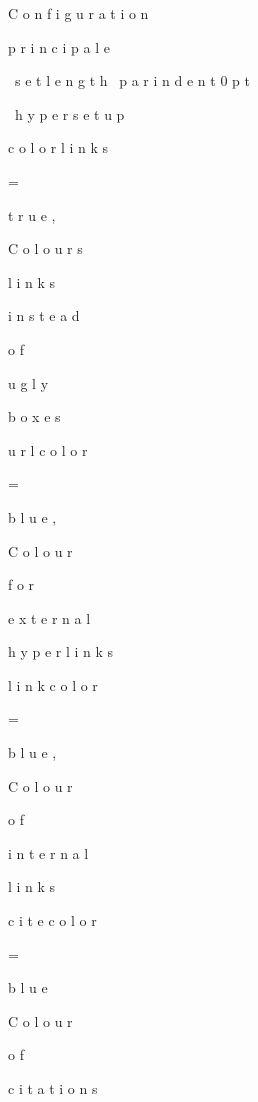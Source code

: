  
 
 
 


%
 
C
o
n
f
i
g
u
r
a
t
i
o
n
 
p
r
i
n
c
i
p
a
l
e

\
s
e
t
l
e
n
g
t
h
{
\
p
a
r
i
n
d
e
n
t
}
{
0
p
t
}


 
 
 
 
\
h
y
p
e
r
s
e
t
u
p
{

 
 
 
 
c
o
l
o
r
l
i
n
k
s
 
 
 
=
 
t
r
u
e
,
 
 
 
 
%
 
C
o
l
o
u
r
s
 
l
i
n
k
s
 
i
n
s
t
e
a
d
 
o
f
 
u
g
l
y
 
b
o
x
e
s

 
 
 
 
u
r
l
c
o
l
o
r
 
 
 
 
 
=
 
b
l
u
e
,
 
 
 
 
%
 
C
o
l
o
u
r
 
f
o
r
 
e
x
t
e
r
n
a
l
 
h
y
p
e
r
l
i
n
k
s

 
 
 
 
l
i
n
k
c
o
l
o
r
 
 
 
 
=
 
b
l
u
e
,
 
 
 
 
%
 
C
o
l
o
u
r
 
o
f
 
i
n
t
e
r
n
a
l
 
l
i
n
k
s

 
 
 
 
c
i
t
e
c
o
l
o
r
 
 
 
 
=
 
b
l
u
e
 
 
 
 
 
 
%
 
C
o
l
o
u
r
 
o
f
 
c
i
t
a
t
i
o
n
s

 
 
 
 
}

